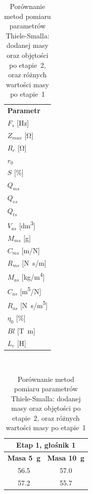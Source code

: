 \documentclass[12pt]{oska}
\begin{document}
	\begin{table}[!ht]
		\centering
		\caption{Porównanie metod pomiaru parametrów Thiele-Smalla: dodanej masy oraz objętości po etapie~2, oraz różnych wartości masy po etapie~1}
		\label{t:TS_metody}
		\boldmath
		\begin{tabular}{|l|}
			\hline
			\multirow{2}{*}{\textbf{Parametr}} 	\\
			\\\hline
			\hline                              							
			$F_s$ [\si{\hertz}] \\\hline
			$Z_{max}$ [\si{\ohm}] \\\hline
			$R_e$ [\si{\ohm}] \\\hline
			$r_0$ \\\hline
			$S$ [\%]\\\hline
			\hline                              							
			$Q_{ms}$ 	\\\hline
			$Q_{es}$ \\\hline	
			$Q_{ts}$ \\\hline
			\hline                                                  		
			$V_{as}$ [\si{\deci\metre\cubed}] \\\hline
			$M_{ms}$ [\si{\gram}] 	\\\hline
			$C_{ms}$ [\si[per-mode=symbol]{\metre\per\newton}] 	\\\hline
			$R_{ms}$ [\si[per-mode=symbol]{\newton\s\per\m}] 	\\\hline
			\hline
			$M_{as}$ [\si[per-mode=symbol]{\kilo\gram\per\metre\tothe{4}}] 	\\\hline
			$C_{as}$ [\si[per-mode=symbol]{\metre\tothe{5}\per\newton}] \\\hline	
			$R_{as}$ [\si[per-mode=symbol]{\newton\s\per\metre\tothe{5}}] 	\\\hline
			\hline
			$\eta_0$ [\%] 	\\\hline
			$Bl$ [\si{\tesla\metre}]	\\\hline
			$L_{e}$ [\si{\henry}] 	\\\hline
		\end{tabular}
		\unboldmath
		~ \quad
		\begin{tabular}{|c|c|}
			\hline
			\multicolumn{2}{|c|}{\textbf{Etap 1, głośnik 1}} \\\hline
			\textbf{Masa \SI{5}{\gram}} & \textbf{Masa \SI{10}{\gram}} \\\hline
			\hline
			\num{56,5} 	& \num{57,0} 	 \\\hline
			\num{57,2} 	& \num{55,7} 	 \\\hline

\end{tabular}
\end{table}
\end{document}
